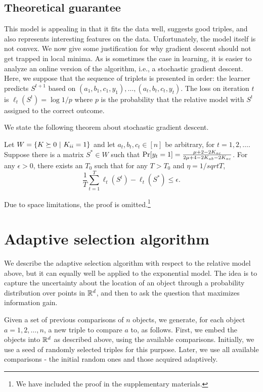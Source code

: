 \documentclass{article}
\begin{document}
\subsection{Theoretical guarantee}

This model is appealing in that it fits the data well, suggests good triples, and also represents interesting features on the data.  Unfortunately, the model itself is not convex.  We now give some justification for why gradient descent should not get trapped in local minima.  As is sometimes the case in learning, it is easier to analyze an online version of the algorithm, i.e., a stochastic gradient descent.  Here, we suppose that the sequence of triplets is presented in order: the learner predicts $S^{t+1}$ based on $(a_1,b_1,c_1,y_1),\ldots,(a_t,b_t,c_t,y_t)$.  The loss on iteration $t$ is $\ell_t(S^t)=\log 1/p$ where $p$ is the probability that the relative model with $S^t$ assigned to the correct outcome.  

We state the following theorem about stochastic gradient descent.
\begin{theorem}
Let $W = \{\S \succeq 0~|~\S_{ii}=1\}$ and let $a_t,b_t,c_t \in [n]$ be arbitrary, for $t=1,2,\ldots$.  Suppose there is a matrix $S^*\in W$ such that $\Pr[y_t=1]=\frac{\mu+2-2\S_{ac}}{2\mu+4-2\S_{ab}-2\S_{ac}}$.  For any $\epsilon>0$, there exists an $T_0$ such that for any $T>T_0$ and $\eta=1/sqrt{T}$, 
$$\frac{1}{T}\sum_{t=1}^T \ell_t(S^t)-\ell_t(S^*) \leq \epsilon.$$
\end{theorem}
Due to space limitations, the proof is omitted.\footnote{We have included the proof in the supplementary materials.}

\section{Adaptive selection algorithm}

We describe the adaptive selection algorithm with respect to the
relative model above, but it can equally well be applied to the
exponential model.  The idea is to capture the uncertainty about the
location of an object through a probability distribution over points
in $\reals^d$, and then to ask the question that maximizes information
gain.

Given a set of previous comparisons of $n$ objects, we generate, for
each object $a=1,2,\ldots,n$, a new triple to compare $a$ to, as
follows.  First, we embed the objects into $\reals^d$ as described
above, using the available comparisons. Initially, we use a seed of
randomly selected triples for this purpose. Later, we use all
available comparisons - the initial random ones and those acquired
adaptively.
\end{document}
